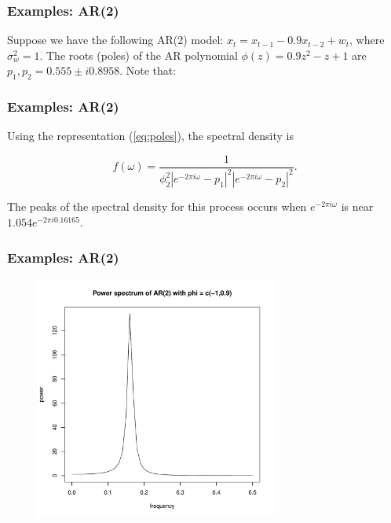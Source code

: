 \documentclass[%
xcolor=pdftex]{beamer}
\begin{document}







\begin{frame}
\frametitle{Examples: AR(2)}

Suppose we have the following AR(2) model: $x_t = x_{t-1} - 0.9 x_{t-2} + w_t$, where $\sigma_w^2 = 1$. The roots (poles) of the AR polynomial $\phi(z) = 0.9z^2 - z + 1$ are $p_1, p_2 = 0.555 \pm i0.8958$. Note that:

\vspace{40mm}

\end{frame}

\begin{frame}
\frametitle{Examples: AR(2)}

Using the representation (\ref{eq:poles}), the spectral density is

$$
f(\omega) = \frac{1}{\phi_2^2 \left \lvert e^{-2 \pi i \omega} - p_1 \right \rvert^2 \left \lvert e^{-2 \pi i \omega} - p_2 \right \rvert^2}.
$$

The peaks of the spectral density for this process occurs when $e^{-2 \pi i \omega}$ is near $1.054e^{-2 \pi i 0.16165}$.

\end{frame}

\begin{frame}
\frametitle{Examples: AR(2)}

\includegraphics[width=100mm, height=80mm]{ar2power.pdf}

\end{frame}
\end{document}
